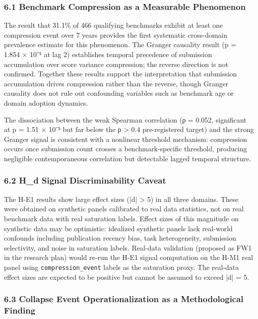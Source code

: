 
\subsubsection{6.1 Benchmark Compression as a Measurable Phenomenon}

The result that 31.1\% of 466 qualifying benchmarks exhibit at least one compression event over 7 years provides the first systematic cross-domain prevalence estimate for this phenomenon. The Granger causality result (p = 1.854 × 10⁻⁵ at lag 2) establishes temporal precedence of submission accumulation over score variance compression; the reverse direction is not confirmed. Together these results support the interpretation that submission accumulation drives compression rather than the reverse, though Granger causality does not rule out confounding variables such as benchmark age or domain adoption dynamics.

The dissociation between the weak Spearman correlation (ρ = 0.052, significant at p = 1.51 × 10⁻⁵ but far below the ρ > 0.4 pre-registered target) and the strong Granger signal is consistent with a nonlinear threshold mechanism: compression occurs once submission count crosses a benchmark-specific threshold, producing negligible contemporaneous correlation but detectable lagged temporal structure.

\subsubsection{6.2 H_d Signal Discriminability Caveat}

The H-E1 results show large effect sizes (|d| > 5) in all three domains. These were obtained on synthetic panels calibrated to real data statistics, not on real benchmark data with real saturation labels. Effect sizes of this magnitude on synthetic data may be optimistic: idealized synthetic panels lack real-world confounds including publication recency bias, task heterogeneity, submission selectivity, and noise in saturation labels. Real-data validation (proposed as FW1 in the research plan) would re-run the H-E1 signal computation on the H-M1 real panel using \texttt{compression_event} labels as the saturation proxy. The real-data effect sizes are expected to be positive but cannot be assumed to exceed |d| = 5.

\subsubsection{6.3 Collapse Event Operationalization as a Methodological Finding}

